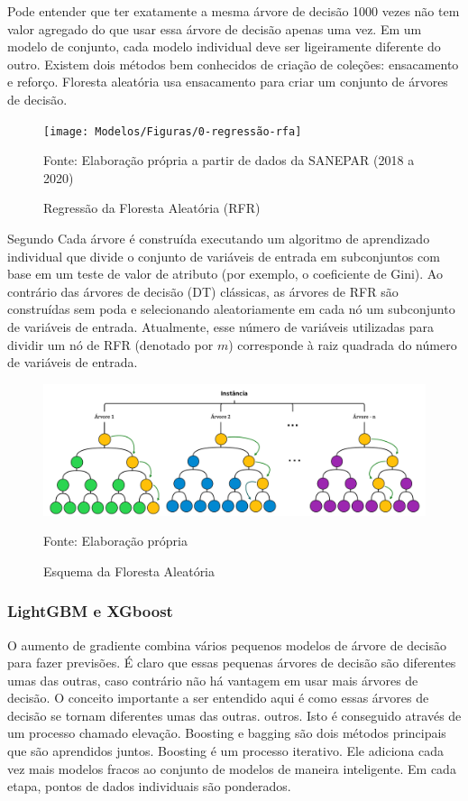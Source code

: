 Pode entender que ter exatamente a mesma árvore de decisão 1000 vezes não tem valor agregado do que usar essa árvore de decisão apenas uma vez.  Em um modelo de conjunto, cada modelo individual deve ser ligeiramente diferente do outro. Existem dois métodos bem conhecidos de criação de coleções: ensacamento e reforço.  Floresta aleatória usa ensacamento para criar um conjunto de árvores de decisão.
\vspace{-5mm}

\begin{figure}[H]
	\centering
	\caption{Regressão da Floresta Aleatória (RFR)}
	\label{fig:1-regressao-rfa}
	\texttt{[image: Modelos/Figuras/0-regressão-rfa]}
	
	Fonte: Elaboração própria a partir de dados da SANEPAR (2018 a 2020)
\end{figure}

Segundo  Cada árvore é construída executando um algoritmo de aprendizado individual que divide o conjunto de variáveis de entrada em subconjuntos com base em um teste de valor de atributo (por exemplo, o coeficiente de Gini). Ao contrário das árvores de decisão (DT) clássicas, as árvores de RFR são construídas sem poda e selecionando aleatoriamente em cada nó um subconjunto de variáveis de entrada. Atualmente, esse número de variáveis utilizadas para dividir um nó de RFR (denotado por $m$) corresponde à raiz quadrada do número de variáveis de entrada.

\begin{figure}[H]
	\centering
	\caption{Esquema da Floresta Aleatória}
	\label{fig:rf}
	\includegraphics[width=0.9\linewidth]{Modelos/Figuras/RF}
	
	Fonte: Elaboração própria
\end{figure}


\subsubsection{LightGBM e XGboost}\label{subsubsec:lgbxgb}

O aumento de gradiente combina vários pequenos modelos de árvore de decisão para fazer previsões. É claro que essas pequenas árvores de decisão são diferentes umas das outras, caso contrário não há vantagem em usar mais árvores de decisão. O conceito importante a ser entendido aqui é como essas árvores de decisão se tornam diferentes umas das outras. outros. Isto é conseguido através de um processo chamado elevação. Boosting e bagging são dois métodos principais que são aprendidos juntos.  Boosting é um processo iterativo. Ele adiciona cada vez mais modelos fracos ao conjunto de modelos de maneira inteligente. Em cada etapa, pontos de dados individuais são ponderados.  

